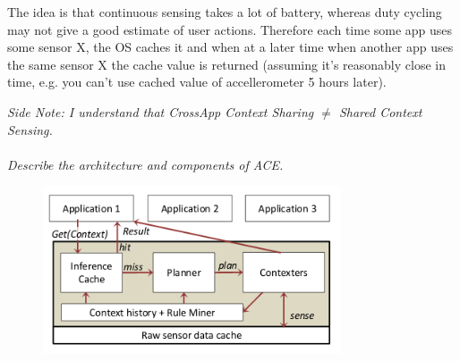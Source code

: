\documentclass[12pt]{article}
\newcommand*\circled[1]{\tikz[baseline=(char.base)]{
		\node[shape=circle,draw,inner sep=0pt] (char) {#1};}}
\begin{document}
The idea is that continuous sensing takes a lot of battery, whereas duty
cycling may not give a good estimate of user actions. Therefore each time some
app uses some sensor X, the OS caches it and when at a later time when another
app uses the same sensor X the cache value is returned (assuming it's
reasonably close in time, e.g. you can't use cached value of accellerometer
5 hours later).

\emph{Side Note: I understand that CrossApp Context Sharing $\neq$ Shared
Context Sensing.}
\\
\\
\textit{\circled{5.} Describe the architecture and components of ACE.}

\begin{figure}[H]
    \centering
    \includegraphics[width=250pt]{ACE_Architecture.png}
\end{figure}
\end{document}
